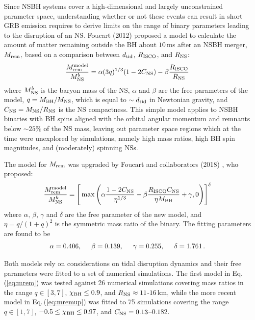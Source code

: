 \documentclass[binding=0.6cm, LaM]{sapthesis}
\begin{document}
        Since NSBH systems cover a high-dimensional and largely unconstrained parameter space,
        understanding whether or not these events can result in short GRB emission requires to
        derive limits on the range of binary parameters leading to the disruption of an NS.
        Foucart (2012) \cite{50} proposed a model to calculate the amount of matter remaining
        outside the BH about $10\,$ms after an NSBH merger, $M_{\rm rem}$, based on a comparison
        between $d_{\rm tid}$, $R_{\rm ISCO}$, and $R_{\rm NS}$:
        \begin{equation}
          \label{eq:mrem}
          {{M_{\rm rem}^{\rm model}} \over {M^b_{\rm NS}}} = \alpha(3q)^{1/3}(1 - 2C_{\rm NS}) - \beta{{R_{\rm ISCO}} \over {R_{\rm NS}}}
        \end{equation}
        where $M^b_{\rm NS}$ is the baryon mass of the NS, $\alpha$ and $\beta$ are the free parameters of the model,
        $q=M_{\rm BH}/M_{\rm NS}$, which is equal to $\sim d_{\rm tid}$ in Newtonian gravity, and $C_{\rm NS} = M_{\rm NS}/R_{\rm NS}$ is the NS compactness. 
        This simple model applies to NSBH binaries with BH spins aligned with the orbital angular momentum and remnants below
        $\sim 25\%$ of the NS mass, leaving out parameter space regions which at the time were unexplored by simulations, 
        namely high mass ratios, high BH spin magnitudes, and (moderately) spinning NSs.

        The model for $M_{\rm rem}$ was upgraded by Foucart and collaborators (2018) \cite{54}, who proposed:
        \begin{equation}
          \label{eq:mremup}
          {{M_{\rm rem}^{\rm model}} \over {M^b_{\rm NS}}} = \Bigg[ \max \Bigg( \alpha{{1 - 2C_{\rm NS}} \over {\eta^{1/3}}} - \beta {{R_{\rm ISCO}C_{\rm NS}} \over{\eta M_{\rm BH}}} + \gamma, 0 \Bigg)\Bigg]^{\delta}
        \end{equation}
        where $\alpha$, $\beta$, $\gamma$ and $\delta$ are the free parameter of the new model, and $\eta = q/(1+q)^2$ is the symmetric mass ratio of the binary.  The fitting parameters are found to be
	\begin{equation}
		\alpha=0.406, \hspace*{0.5cm}  \beta=0.139, \hspace*{0.5cm}  \gamma=0.255, \hspace*{0.5cm} \delta=1.761\,.
	\end{equation}

        Both models rely on considerations on tidal disruption dynamics and
        their free parameters were fitted to a set of numerical simulations.
        The first model in Eq.\,(\ref{eq:mrem}) was tested against 26 numerical simulations covering mass ratios
        in the range $q\in [3,7]$, $\chi_{\rm BH}\leq 0.9$, and $R_{\rm NS} \approx 11$-$16\,$km,
        while the more recent model in Eq.\,(\ref{eq:mremup}) was fitted to 75 simulations covering the range $q\in [1,7]$, $-0.5 \leq \chi_{\rm BH}\leq 0.97$,
        and $C_{\rm NS} = 0.13$--$0.182$.
\end{document}
